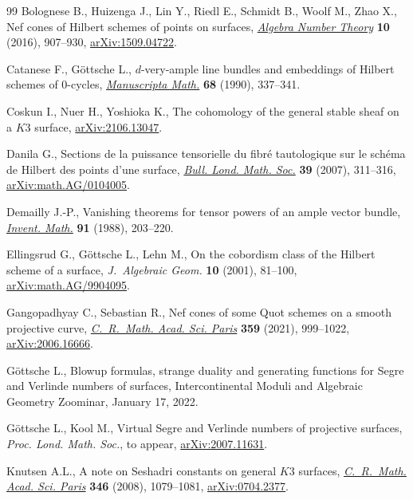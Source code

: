 \documentclass[pdftex]{sigma}
\numberwithin{equation}{section}
\begin{document}
\begin{thebibliography}{99}
Bolognese B., Huizenga J., Lin Y., Riedl E., Schmidt B., Woolf M., Zhao X., Nef
 cones of {H}ilbert schemes of points on surfaces, \href{https://doi.org/10.2140/ant.2016.10.907}{\textit{Algebra Number
 Theory}} \textbf{10} (2016), 907--930, \href{https://arxiv.org/abs/1509.04722}{arXiv:1509.04722}.

Catanese F., G\"ottsche L., {$d$}-very-ample line bundles and embeddings of
 {H}ilbert schemes of {$0$}-cycles, \href{https://doi.org/10.1007/BF02568768}{\textit{Manuscripta Math.}} \textbf{68}
 (1990), 337--341.

Coskun I., Nuer H., Yoshioka K., The cohomology of the general stable sheaf on
 a $K3$ surface, \href{https://arxiv.org/abs/2106.13047}{arXiv:2106.13047}.

Danila G., Sections de la puissance tensorielle du fibr\'e tautologique sur le
 sch\'ema de {H}ilbert des points d'une surface, \href{https://doi.org/10.1112/blms/bdl035}{\textit{Bull. Lond. Math.
 Soc.}} \textbf{39} (2007), 311--316, \href{https://arxiv.org/abs/math.AG/0104005}{arXiv:math.AG/0104005}.

Demailly J.-P., Vanishing theorems for tensor powers of an ample vector bundle,
 \href{https://doi.org/10.1007/BF01404918}{\textit{Invent. Math.}} \textbf{91} (1988), 203--220.

Ellingsrud G., G\"ottsche L., Lehn M., On the cobordism class of the {H}ilbert
 scheme of a surface, \textit{J.~Algebraic Geom.} \textbf{10} (2001), 81--100,
 \href{https://arxiv.org/abs/math.AG/9904095}{arXiv:math.AG/9904095}.

Gangopadhyay C., Sebastian R., Nef cones of some {Q}uot schemes on a smooth
 projective curve, \href{https://doi.org/10.5802/crmath.245}{\textit{C.~R.~Math. Acad. Sci. Paris}} \textbf{359} (2021),
 999--1022, \href{https://arxiv.org/abs/2006.16666}{arXiv:2006.16666}.

G\"ottsche L., Blowup formulas, strange duality and generating functions for
 Segre and Verlinde numbers of surfaces, {I}ntercontinental Moduli and
 Algebraic Geometry Zoominar, January 17, 2022.

G\"ottsche L., Kool M., Virtual Segre and Verlinde numbers of projective
 surfaces, \textit{Proc. Lond. Math. Soc.}, {t}o appear, \href{https://arxiv.org/abs/2007.11631}{arXiv:2007.11631}.

Knutsen A.L., A note on {S}eshadri constants on general {$K3$} surfaces,
 \href{https://doi.org/10.1016/j.crma.2008.09.008}{\textit{C.~R.~Math. Acad. Sci. Paris}} \textbf{346} (2008), 1079--1081,
 \href{https://arxiv.org/abs/0704.2377}{arXiv:0704.2377}.


\end{thebibliography}
\end{document}
